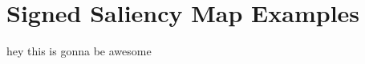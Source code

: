 \documentclass[preprint,12pt]{elsarticle}
\begin{document}
 


\appendix

\section{Signed Saliency Map Examples}
\label{sec:signed saliency map examples}
hey this is gonna be awesome







\end{document}
